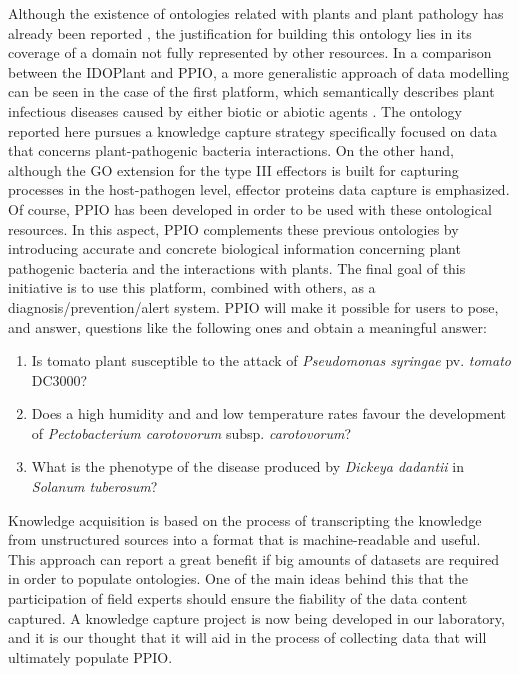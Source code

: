 \documentclass[sw]{iosart2c}
\begin{document}
Although the existence of ontologies related with plants and plant pathology has already been reported \cite{PTO} \cite{Lindeberg} \cite{Walls}, the justification for building this ontology lies in its coverage of a domain not fully represented by other resources. In a comparison between the IDOPlant and PPIO, a more generalistic approach of data modelling can be seen in the case of the first platform, which semantically describes plant infectious diseases caused by either biotic or abiotic agents . The ontology reported here pursues a knowledge capture strategy specifically focused on data that concerns plant-pathogenic bacteria interactions. On the other hand, although the GO extension for the type III effectors is built for capturing processes in the host-pathogen level, effector proteins data capture is emphasized. Of course, PPIO has been developed in order to be used with these ontological resources. In this aspect, PPIO complements these previous ontologies by introducing accurate and concrete biological information concerning plant pathogenic bacteria and the interactions with plants. The final goal of this initiative is to use this platform, combined with others, as a diagnosis/prevention/alert system. PPIO will make it possible for users to pose, and answer, questions like the following ones and obtain a meaningful answer:

\begin{enumerate}
\item Is tomato plant susceptible to the attack of {\itshape Pseudomonas syringae} pv. {\itshape tomato} DC3000?
\item Does a high humidity and and low temperature rates favour the development of {\itshape Pectobacterium carotovorum} subsp. {\itshape carotovorum}?
\item What is the phenotype of the disease produced by {\itshape Dickeya dadantii} in {\itshape Solanum tuberosum}?

\end{enumerate}

Knowledge acquisition is based on the process of transcripting the knowledge from unstructured sources into a format that is machine-readable and useful. This approach can report a great benefit if big amounts of datasets are required in order to populate ontologies. One of the main ideas behind this that the participation of field experts should ensure the fiability of the data content captured. A knowledge capture project is now being developed in our laboratory, and it is our thought that it will aid in the process of collecting data that will ultimately populate PPIO. 
\end{document}
